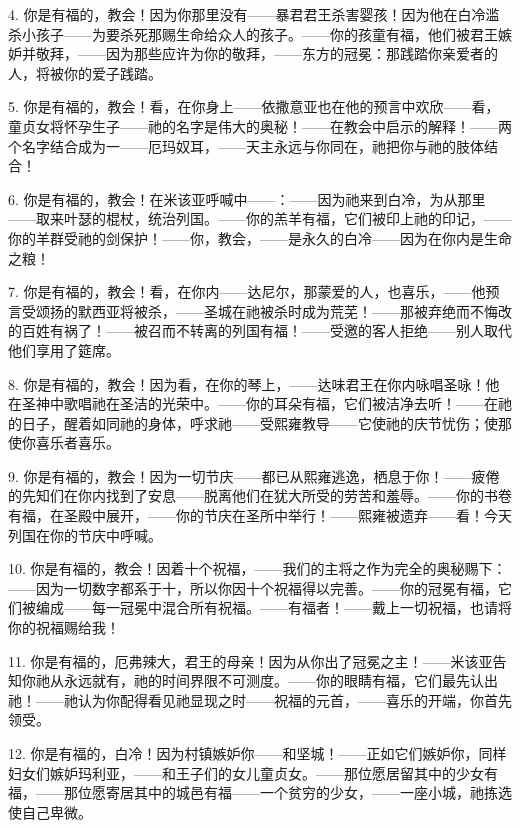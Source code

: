 4. 你是有福的，教会！因为你那里没有——暴君君王杀害婴孩！因为他在白冷滥杀小孩子——为要杀死那赐生命给众人的孩子。——你的孩童有福，他们被君王嫉妒并敬拜，——因为那些应许为你的敬拜，——东方的冠冕：那践踏你亲爱者的人，将被你的爱子践踏。\par

5. 你是有福的，教会！看，在你身上——依撒意亚也在他的预言中欢欣——看，童贞女将怀孕生子——祂的名字是伟大的奥秘！——在教会中启示的解释！——两个名字结合成为一——厄玛奴耳，——天主永远与你同在，祂把你与祂的肢体结合！\par

6. 你是有福的，教会！在米该亚呼喊中——：——因为祂来到白冷，为从那里——取来叶瑟的棍杖，统治列国。——你的羔羊有福，它们被印上祂的印记，——你的羊群受祂的剑保护！——你，教会，——是永久的白冷——因为在你内是生命之粮！\par

7. 你是有福的，教会！看，在你内——达尼尔，那蒙爱的人，也喜乐，——他预言受颂扬的默西亚将被杀，——圣城在祂被杀时成为荒芜！——那被弃绝而不悔改的百姓有祸了！——被召而不转离的列国有福！——受邀的客人拒绝——别人取代他们享用了筵席。\par

8. 你是有福的，教会！因为看，在你的琴上，——达味君王在你内咏唱圣咏！他在圣神中歌唱祂在圣洁的光荣中。——你的耳朵有福，它们被洁净去听！——在祂的日子，醒着如同祂的身体，呼求祂——受熙雍教导——它使祂的庆节忧伤；使那使你喜乐者喜乐。\par

9. 你是有福的，教会！因为一切节庆——都已从熙雍逃逸，栖息于你！——疲倦的先知们在你内找到了安息——脱离他们在犹大所受的劳苦和羞辱。——你的书卷有福，在圣殿中展开，——你的节庆在圣所中举行！——熙雍被遗弃——看！今天列国在你的节庆中呼喊。\par

10. 你是有福的，教会！因着十个祝福，——我们的主将之作为完全的奥秘赐下：——因为一切数字都系于十，所以你因十个祝福得以完善。——你的冠冕有福，它们被编成——每一冠冕中混合所有祝福。——有福者！——戴上一切祝福，也请将你的祝福赐给我！\par

11. 你是有福的，厄弗辣大，君王的母亲！因为从你出了冠冕之主！——米该亚告知你祂从永远就有，祂的时间界限不可测度。——你的眼睛有福，它们最先认出祂！——祂认为你配得看见祂显现之时——祝福的元首，——喜乐的开端，你首先领受。\par

12. 你是有福的，白冷！因为村镇嫉妒你——和坚城！——正如它们嫉妒你，同样妇女们嫉妒玛利亚，——和王子们的女儿童贞女。——那位愿居留其中的少女有福，——那位愿寄居其中的城邑有福——一个贫穷的少女，——一座小城，祂拣选使自己卑微。\par


